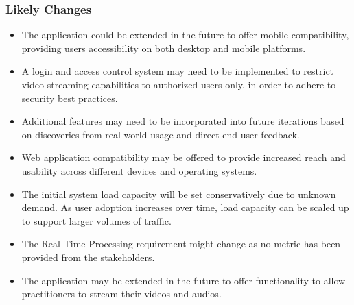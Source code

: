 \documentclass[12pt]{article}
\begin{document}
\subsubsection*{Likely Changes}
\begin{itemize}
  \item The application could be extended in the future to offer mobile compatibility, providing users accessibility on both desktop and mobile platforms.
  \item A login and access control system may need to be implemented to restrict video streaming capabilities to authorized users only, in order to adhere to security best practices.
  \item Additional features may need to be incorporated into future iterations based on discoveries from real-world usage and direct end user feedback.
  \item Web application compatibility may be offered to provide increased reach and usability across different devices and operating systems.
  \item The initial system load capacity will be set conservatively due to unknown demand. As user adoption increases over time, load capacity can be scaled up to support larger volumes of traffic.
  \item The Real-Time Processing requirement might change as no metric has been provided from the stakeholders.
  \item The application may be extended in the future to offer functionality to allow practitioners to stream their videos and audios.
\end{itemize}
\end{document}
